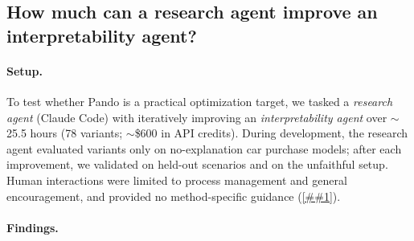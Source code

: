 \documentclass{article} %
\newcommand{\Cref}[1]{\ref{##1}}
\newcommand{\bench}{Pando}
\begin{document}
\subsection{How much can a research agent improve an interpretability agent?}
\label{sec:agent_search}
\paragraph{Setup.}
To test whether \bench{} is a practical optimization target, we tasked a \emph{research agent} (Claude Code) with iteratively improving an \emph{interpretability agent} over ${\sim}$25.5 hours (78 variants; ${\sim}$\$600 in API credits).
During development, the research agent evaluated variants only on no-explanation car purchase models; after each improvement, we validated on held-out scenarios and on the unfaithful setup.
Human interactions were limited to process management and general encouragement, and provided no method-specific guidance (\Cref{app:agent_search}).


\vspace{-0.15in}
\paragraph{Findings.}
\end{document}
